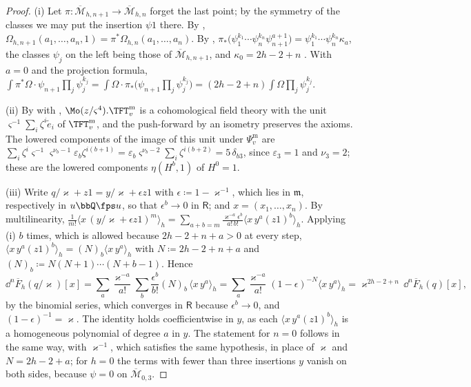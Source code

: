 \begin{proof}
(i) Let $\pi\colon\overline{\mathcal M}_{h,n+1}\to\overline{\mathcal M}_{h,n}$ forget the last point; by the symmetry of the classes we may put the insertion $\psi1$ there. By \cite[Def.~0.3~(iii)]{PPZ15}, $\Omega_{h,n+1}(a_1,\dots,a_n,1)=\pi^*\Omega_{h,n}(a_1,\dots,a_n)$. By \cite[(1.7)]{AC96}, $\pi_*\bigl(\psi_1^{k_1}\cdots\psi_n^{k_n}\psi_{n+1}^{a+1}\bigr)=\psi_1^{k_1}\cdots\psi_n^{k_n}\kappa_a$, the classes $\psi_j$ on the left being those of $\overline{\mathcal M}_{h,n+1}$, and $\kappa_0=2h-2+n$ \cite[p.~5]{AC96}. With $a=0$ and the projection formula, $\int\pi^*\Omega\cdot\psi_{n+1}\prod_j\psi_j^{k_j}=\int\Omega\cdot\pi_*\bigl(\psi_{n+1}\prod_j\psi_j^{k_j}\bigr)=(2h-2+n)\int\Omega\prod_j\psi_j^{k_j}$.

(ii) By \cite[Prop.~2.12]{PPZ15} with \cite[Def.~2.13]{PPZ15}, $\Mo(z/\varsigma^4).\TFT^{\mathrm m}_v$ is a cohomological field theory with the unit $\varsigma^{-1}\sum_i\zeta^i\tilde e_i$ of $\TFT^{\mathrm m}_v$, and the push-forward by an isometry preserves the axioms. The lowered components of the image of this unit under $\Psi^{\mathrm m}_v$ are $\sum_i\zeta^i\varsigma^{-1}\varsigma^{\nu_b-1}\varepsilon_b\zeta^{i(b+1)}=\varepsilon_b\varsigma^{\nu_b-2}\sum_i\zeta^{i(b+2)}=5\,\delta_{b3}$, since $\varepsilon_3=1$ and $\nu_3=2$; these are the lowered components $\eta(H^b,1)$ of $H^0=1$.

(iii) Write $q/\varkappa+z1=y/\varkappa+\epsilon z1$ with $\epsilon\coloneqq1-\varkappa^{-1}$, which lies in $\mathfrak m$, respectively in $u\bbQ\fps u$, so that $\epsilon^b\to0$ in $\mathsf R$; and $x=(x_1,\dots,x_n)$. By multilinearity, $\frac1{m!}\langle x\,(y/\varkappa+\epsilon z1)^m\rangle_h=\sum_{a+b=m}\frac{\varkappa^{-a}\epsilon^b}{a!\,b!}\langle x\,y^a(z1)^b\rangle_h$. Applying (i) $b$ times, which is allowed because $2h-2+n+a>0$ at every step, $\langle x\,y^a(z1)^b\rangle_h=(N)_b\langle x\,y^a\rangle_h$ with $N\coloneqq2h-2+n+a$ and $(N)_b\coloneqq N(N+1)\cdots(N+b-1)$. Hence
\[
\dd^n\overline F_h(q/\varkappa)[x]=\sum_a\frac{\varkappa^{-a}}{a!}\sum_b\frac{\epsilon^b}{b!}(N)_b\,\langle x\,y^a\rangle_h=\sum_a\frac{\varkappa^{-a}}{a!}(1-\epsilon)^{-N}\langle x\,y^a\rangle_h=\varkappa^{2h-2+n}\,\dd^n\overline F_h(q)[x],
\]
by the binomial series, which converges in $\mathsf R$ because $\epsilon^b\to0$, and $(1-\epsilon)^{-1}=\varkappa$. The identity holds coefficientwise in $y$, as each $\langle x\,y^a(z1)^b\rangle_h$ is a homogeneous polynomial of degree $a$ in $y$. The statement for $n=0$ follows in the same way, with $\varkappa^{-1}$, which satisfies the same hypothesis, in place of $\varkappa$ and $N=2h-2+a$; for $h=0$ the terms with fewer than three insertions $y$ vanish on both sides, because $\psi=0$ on $\overline{\mathcal M}_{0,3}$.
\end{proof}

